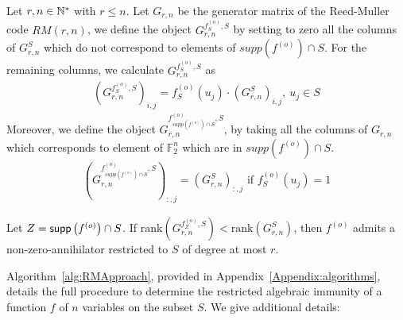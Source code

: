 \documentclass[11pt]{llncs}
\begin{document}
\begin{definition}\label{def:generatorsS}
Let $r,n\in\mathbb{N}^*$ with $r\leq n$. Let $G_{r,n}$ be the generator matrix of the Reed-Muller code $RM(r,n)$, we define the object $G_{r,n}^{f^{(o)}_S,S}$ by setting to zero all the columns of $G_{r,n}^S$ which do not correspond to elements of $supp(f^{(o)} )\cap S$. For the remaining columns, we calculate $G_{r,n}^{f_S^{(o)},S}$ as
	\begin{align*}
	\left(G_{r,n}^{f^{(o)}_S,S}\right)_{i,j} = f_S^{(o)}(u_j) \cdot \left(G_{r,n}^S\right)_{i,j}, \ u_j \in S
	\end{align*}
	Moreover, we define the object $G_{r,n}^{f^{(o)}_{supp\left(f^{(o)}\right) \cap S},S}$, by taking all the columns of $G_{r,n}$ which corresponds to element of $\mathbb{F}_2^n$ which are in $supp\left(f^{(o)}\right) \cap S$.
	\begin{align}
	\left(G_{r,n}^{f_{supp\left(f^{(o)}\right) \cap S}^{(o)},S}\right)_{:,j} = (G_{r,n}^S)_{:,j} \mbox{ if } f_S^{(o)}(u_j) = 1 \label{eq:f-generatorRestrictedSet}
	\end{align}
\end{definition}

\begin{proposition}\label{prop:compareranks}
	Let $Z = \mathsf{supp}\left(f^{(o)}\right) \cap S$.
	If $\text{rank}\left(G^{f_{Z}^{(o)},S}_{r,n}\right) < \text{rank}(G^{S}_{r,n})$, then $f^{(o)}$ admits a non-zero-annihilator restricted to $S$ of degree at most $r$.
\end{proposition}

Algorithm~\ref{alg:RMApproach}, provided in Appendix~\ref{Appendix:algorithms}, details the full procedure to determine the restricted algebraic immunity of a function $f$ of $n$ variables on the subset $S$. 
We give additional details:
\end{document}
